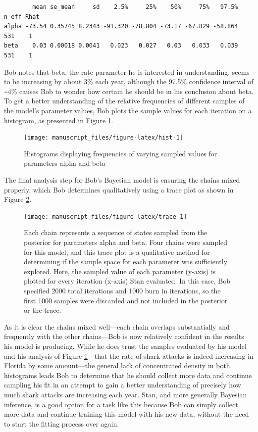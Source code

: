 \documentclass[
  12pt,
  oneside]{book}
\theoremstyle{definition}
\theoremstyle{definition}
\theoremstyle{definition}
\theoremstyle{remark}
\begin{document}
\begin{verbatim}
        mean se_mean     sd    2.5%     25%    50%     75%   97.5% n_eff Rhat
alpha -73.54 0.35745 8.2343 -91.320 -78.804 -73.17 -67.829 -58.864   531    1
beta    0.03 0.00018 0.0041   0.023   0.027   0.03   0.033   0.039   531    1
\end{verbatim}

Bob notes that beta, the rate parameter he is interested in understanding, seems to be increasing by about 3\% each year, although the 97.5\% confidence interval of \textasciitilde4\% causes Bob to wonder how certain he should be in his conclusion about beta. To get a better understanding of the relative frequencies of different samples of the model's parameter values, Bob plots the sample values for each iteration on a histogram, as presented in Figure \ref{fig:hist}.

\begin{figure}

{\centering \texttt{[image: manuscript\_files/figure-latex/hist-1]} 

}

\caption{Histograms displaying frequencies of varying sampled values for parameters alpha and beta}\label{fig:hist}
\end{figure}

The final analysis step for Bob's Bayesian model is ensuring the chains mixed properly, which Bob determines qualitatively using a trace plot as shown in Figure \ref{fig:trace}.

\begin{figure}

{\centering \texttt{[image: manuscript\_files/figure-latex/trace-1]} 

}

\caption{Each chain represents a sequence of states sampled from the posterior for parameters alpha and beta. Four chains were sampled for this model, and this trace plot is a qualitative method for determining if the sample space for each parameter was sufficiently explored. Here, the sampled value of each parameter (y-axis) is plotted for every iteration (x-axis) Stan evaluated. In this case, Bob specified 2000 total iterations and 1000 burn in iterations, so the first 1000 samples were discarded and not included in the posterior or the trace.}\label{fig:trace}
\end{figure}

As it is clear the chains mixed well---each chain overlaps substantially and frequently with the other chains---Bob is now relatively confident in the results his model is producing. While he does trust the samples evaluated by his model and his analysis of Figure \ref{fig:hist}---that the rate of shark attacks is indeed increasing in Florida by some amount---the general lack of concentrated density in both histograms leads Bob to determine that he should collect more data and continue sampling his fit in an attempt to gain a better understanding of precisely how much shark attacks are increasing each year.
Stan, and more generally Bayesian inference, is a good option for a task like this because Bob can simply collect more data and continue training this model with his new data, without the need to start the fitting process over again.
\end{document}
